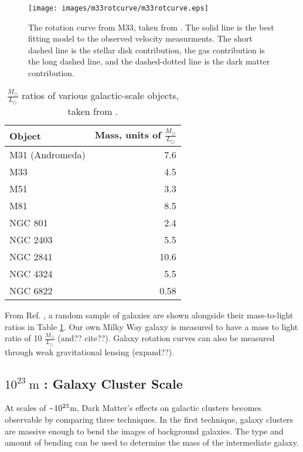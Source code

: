     \begin{figure}[ht]
      \texttt{[image: images/m33rotcurve/m33rotcurve.eps]}
      \caption[M33 Rotation Curve]{
        The rotation curve from M33, taken from \cite{m33rotcurve}.
        The solid line is the best fitting model to the observed velocity measurments.
        The short dashed line is the stellar disk contribution, the gas contribution is the long dashed line, and the dashed-dotted line is the dark matter contribution.
      }
      \label{fig:m33rotcurve}
    \end{figure}
    
    \begin{table}[]
      \centering
      \caption{$\frac{M_\odot}{L_\odot}$ ratios of various galactic-scale objects, taken from \cite{faber_ml}.}
      \label{tab:mlratios}
      \begin{tabular}{l r}
        Object          & Mass, units of $\frac{M_\odot}{L_\odot}$ \\
        \hline
        M31 (Andromeda) &  7.6  \\
        M33             &  4.5  \\
        M51             &  3.3  \\
        M81             &  8.5  \\
        NGC 801         &  2.4  \\
        NGC 2403        &  5.5  \\
        NGC 2841        & 10.6  \\
        NGC 4324        &  5.5  \\
        NGC 6822        &  0.58 \\
      \end{tabular}
    \end{table}
      
    From Ref. \cite{faber_ml}, a random sample of galaxies are shown alongside their mass-to-light ratios in Table \ref{tab:mlratios}.
    Our own Milky Way galaxy is measured to have a mass to light ratio of 10 $\frac{M_{\odot}}{L_{\odot}}$ {\color{red}(and?? cite??)}.
    Galaxy rotation curves can also be measured through weak gravitational lensing \cite{weak_lensing_2001} {\color{red}(expand??)}.

  \subsection{$10^{23}\:\text{m}$ : Galaxy Cluster Scale}
    At scales of $\nicetilde 10^{23}$m, Dark Matter's effects on galactic clusters becomes observable by comparing three techniques.
    In the first technique, galaxy clusters are massive enough to bend the images of background galaxies.
    The type and amount of bending can be used to determine the mass of the intermediate galaxy.

